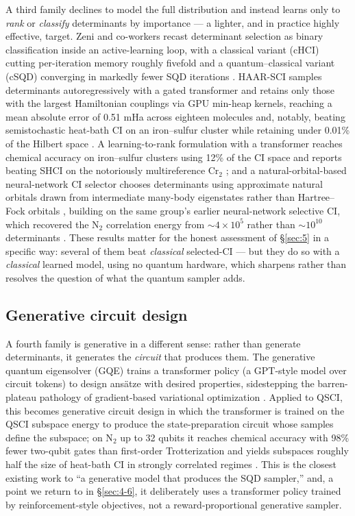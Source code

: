 \documentclass[11pt]{article}
\begin{document}
A third family declines to model the full distribution and instead learns only to \emph{rank} or \emph{classify} determinants by importance --- a lighter, and in practice highly effective, target. Zeni and co-workers recast determinant selection as binary classification inside an active-learning loop, with a classical variant (cHCI) cutting per-iteration memory roughly fivefold and a quantum--classical variant (cSQD) converging in markedly fewer SQD iterations \cite{zeni2026}. HAAR-SCI samples determinants autoregressively with a gated transformer and retains only those with the largest Hamiltonian couplings via GPU min-heap kernels, reaching a mean absolute error of 0.51 mHa across eighteen molecules and, notably, beating semistochastic heat-bath CI on an iron--sulfur cluster while retaining under 0.01\% of the Hilbert space \cite{zhanghaar2025}. A learning-to-rank formulation with a transformer reaches chemical accuracy on iron--sulfur clusters using 12\% of the CI space and reports beating SHCI on the notoriously multireference Cr$_2$ \cite{nie2026}; and a natural-orbital-based neural-network CI selector chooses determinants using approximate natural orbitals drawn from intermediate many-body eigenstates rather than Hartree--Fock orbitals \cite{thirion2025}, building on the same group's earlier neural-network selective CI, which recovered the N$_2$ correlation energy from ${\sim}4\times10^{5}$ rather than ${\sim}10^{10}$ determinants \cite{schmerwitz2024}. These results matter for the honest assessment of \S\ref{sec:5} in a specific way: several of them beat \emph{classical} selected-CI --- but they do so with a \emph{classical} learned model, using no quantum hardware, which sharpens rather than resolves the question of what the quantum sampler adds.


\subsection{Generative circuit design}\label{sec:4-5}

A fourth family is generative in a different sense: rather than generate determinants, it generates the \emph{circuit} that produces them. The generative quantum eigensolver (GQE) trains a transformer policy (a GPT-style model over circuit tokens) to design ansätze with desired properties, sidestepping the barren-plateau pathology of gradient-based variational optimization \cite{nakaji2024}. Applied to QSCI, this becomes generative circuit design in which the transformer is trained on the QSCI subspace energy to produce the state-preparation circuit whose samples define the subspace; on N$_2$ up to 32 qubits it reaches chemical accuracy with 98\% fewer two-qubit gates than first-order Trotterization and yields subspaces roughly half the size of heat-bath CI in strongly correlated regimes \cite{kemmoku2026}. This is the closest existing work to ``a generative model that produces the SQD sampler,'' and, a point we return to in \S\ref{sec:4-6}, it deliberately uses a transformer policy trained by reinforcement-style objectives, not a reward-proportional generative sampler.
\end{document}
